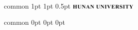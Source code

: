 \documentclass[
    report,     %
    oneside,    %
    UTF8,       %
    zihao=-4    %
]{config} %
\begin{document}
\Header
    {common} %
    {1pt} %
    {1pt} %
    {0.5pt} %
    {} %
    {\includegraphics[width=0.25\textwidth]{figures/logos/HNU-title-EN.png}} %
    {} %


\Footer
    {common} %
    {0pt} %
    {0pt} %
    {0pt} %
    {} %
    {\thepage} %
    {} %




\end{document}
